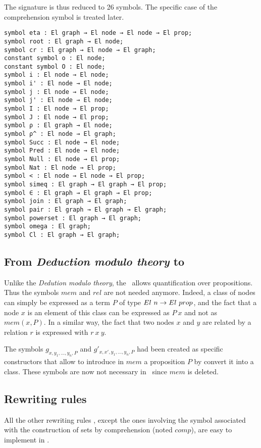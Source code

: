 \documentclass[a4paper]{article}
\begin{document}
The signature is thus reduced to 26 symbols. The specific case of the comprehension symbol is treated later.

\begin{lstlisting}
symbol eta : El graph → El node → El node → El prop;
symbol root : El graph → El node;
symbol cr : El graph → El node → El graph;
constant symbol o : El node;
constant symbol O : El node;
symbol i : El node → El node;
symbol i' : El node → El node;
symbol j : El node → El node;
symbol j' : El node → El node;
symbol I : El node → El prop;
symbol J : El node → El prop;
symbol ρ : El graph → El node;
symbol ρ^ : El node → El graph;
symbol Succ : El node → El node;
symbol Pred : El node → El node;
symbol Null : El node → El prop;
symbol Nat : El node → El prop;
symbol < : El node → El node → El prop;
symbol simeq : El graph → El graph → El prop;
symbol ∈ : El graph → El graph → El prop;
symbol join : El graph → El graph;
symbol pair : El graph → El graph → El graph;
symbol powerset : El graph → El graph;
symbol omega : El graph;
symbol Cl : El graph → El graph;
\end{lstlisting}

\subsection{From \textit{Deduction modulo theory} to \lpcm}

Unlike the \textit{Dedution modulo theory}, the \lpcm ~allows quantification over propositions. \\

Thus the symbols $mem$ and $rel$ \cite[see][Table 2]{zermodulo} are not needed anymore. Indeed, a class of nodes can simply be expressed as a term $P$ of type $El~n \rightarrow El~prop$, and the fact that a node $x$ is an element of this class can be expressed as $P~x$ and not as $mem(x,P)$. In a similar way, the fact that two nodes $x$ and $y$ are related by a relation $r$ is expressed with $r~x~y$.

The symbols $g_{x,y_1,...,y_n,P}$ and $g'_{x,x',y_1,...,y_n,P}$ had been created as specific constructors that allow to introduce in $mem$ a proposition $P$ by convert it into a class. These symbols are now not necessary in \dedukti ~since $mem$ is deleted. 


\subsection{Rewriting rules}

All the other rewriting rules \cite[see][Table 3]{zermodulo}, except the ones involving the symbol associated with the construction of sets by comprehension (noted $comp$), are easy to implement in \dedukti.
\end{document}

